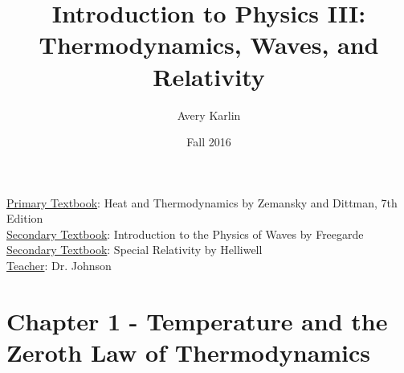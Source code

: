 \documentclass[11 pt, twoside]{article}
\begin{document}
\title{Introduction to Physics III: Thermodynamics, Waves, and Relativity}
\author{Avery Karlin}
\date{Fall 2016}
\newcommand{\textbook}{Heat and Thermodynamics by Zemansky and Dittman, 7th Edition}
\newcommand{\teacher}{Dr. Johnson}

\maketitle
\newpage
\hypertarget{content}{\tableofcontents}
\vspace{11pt}
\noindent
\underline{Primary Textbook}: \textbook\\
\underline{Secondary Textbook}: Introduction to the Physics of Waves by Freegarde \\
\underline{Secondary Textbook}: Special Relativity by Helliwell \\
\underline{Teacher}: \teacher
\newpage

\section{Chapter 1 - Temperature and the Zeroth Law of Thermodynamics}
\end{document}
